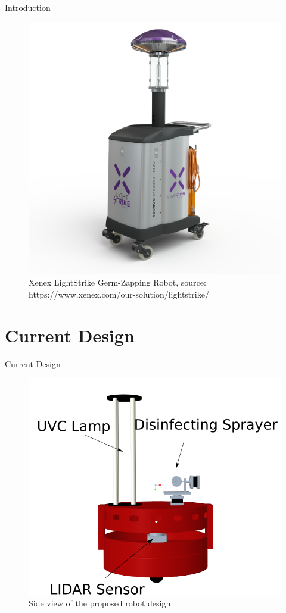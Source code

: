 \documentclass{beamer}
\begin{document}
\begin{frame}{Introduction}{}
\begin{figure}
	\centering
	\includegraphics[scale=0.15]{figs/img/xenexLightstrike}
	\caption{Xenex LightStrike Germ-Zapping Robot, source: https://www.xenex.com/our-solution/lightstrike/}
\end{figure}
\end{frame}

\section{Current Design}
\begin{frame}{Current Design}{}
\begin{figure}
    \centering
    \includegraphics[scale=0.3]{figs/img/frontViewScreenshotA}
    \caption{Side view of the proposed robot design}
    \label{fig:sideViewRobot}
\end{figure}
\end{frame}
\end{document}
